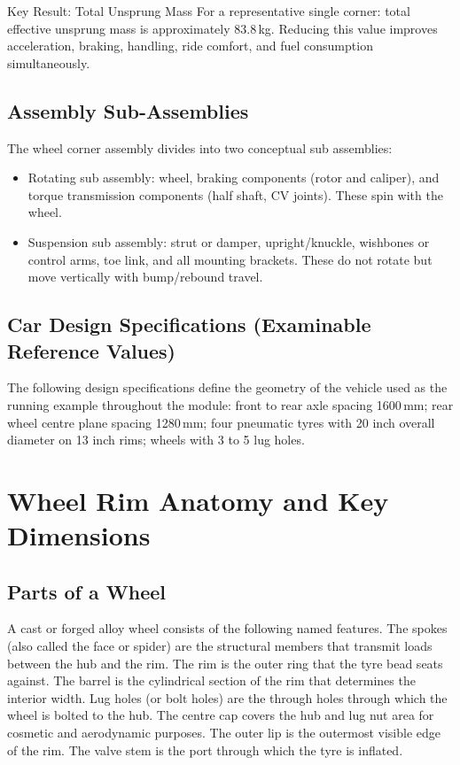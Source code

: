 \documentclass[10pt,a4paper]{article}
\begin{document}
\begin{keybox}{Key Result: Total Unsprung Mass}
For a representative single corner: total effective unsprung mass is approximately 83.8\,kg. Reducing this value improves acceleration, braking, handling, ride comfort, and fuel consumption simultaneously.
\end{keybox}

\subsection{Assembly Sub-Assemblies}

The wheel corner assembly divides into two conceptual sub assemblies:
\begin{itemize}
\item Rotating sub assembly: wheel, braking components (rotor and caliper), and torque transmission components (half shaft, CV joints). These spin with the wheel.
\item Suspension sub assembly: strut or damper, upright/knuckle, wishbones or control arms, toe link, and all mounting brackets. These do not rotate but move vertically with bump/rebound travel.
\end{itemize}

\subsection{Car Design Specifications (Examinable Reference Values)}

The following design specifications define the geometry of the vehicle used as the running example throughout the module: front to rear axle spacing 1600\,mm; rear wheel centre plane spacing 1280\,mm; four pneumatic tyres with 20 inch overall diameter on 13 inch rims; wheels with 3 to 5 lug holes.

\section{Wheel Rim Anatomy and Key Dimensions}

\subsection{Parts of a Wheel}

A cast or forged alloy wheel consists of the following named features. The spokes (also called the face or spider) are the structural members that transmit loads between the hub and the rim. The rim is the outer ring that the tyre bead seats against. The barrel is the cylindrical section of the rim that determines the interior width. Lug holes (or bolt holes) are the through holes through which the wheel is bolted to the hub. The centre cap covers the hub and lug nut area for cosmetic and aerodynamic purposes. The outer lip is the outermost visible edge of the rim. The valve stem is the port through which the tyre is inflated.
\end{document}
